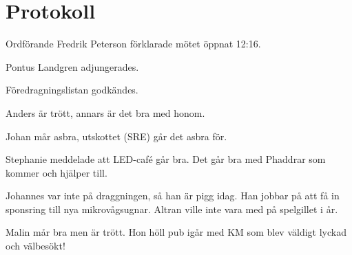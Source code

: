 \documentclass[10pt]{article}
\def\mo{Fredrik Peterson}
\begin{document}
\section*{Protokoll}
\begin{paragrafer}
Ordförande {\mo} förklarade mötet öppnat 12:16.

\valavmo

\valavms

\tosg

Pontus Landgren adjungerades.

\valavj

Föredragningslistan godkändes.


\begin{fyllnadsval} %


\end{fyllnadsval}

\begin{paragrafer}
Anders är trött, annars är det bra med honom.

Johan mår asbra, utskottet (SRE) går det asbra för.

Stephanie meddelade att LED-café går bra. Det går bra med Phaddrar som kommer och hjälper till.

Johannes var inte på draggningen, så han är pigg idag. Han jobbar på att få in sponsring till nya mikrovågsugnar. Altran ville inte vara med på spelgillet i år.

Malin mår bra men är trött. Hon höll pub igår med KM som blev väldigt lyckad och välbesökt!


\end{paragrafer}
\end{paragrafer}
\end{document}
